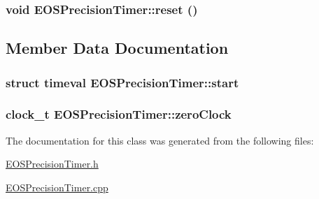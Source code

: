 \hypertarget{classEOSPrecisionTimer_252f1f26efaad6d549de98f9364389ad}{
\subsubsection[{reset}]{\setlength{\rightskip}{0pt plus 5cm}void EOSPrecisionTimer::reset ()}}
\label{classEOSPrecisionTimer_252f1f26efaad6d549de98f9364389ad}




\subsection{Member Data Documentation}
\hypertarget{classEOSPrecisionTimer_df3423fdc02dd0f4356493f2a5733b6e}{
\subsubsection[{start}]{\setlength{\rightskip}{0pt plus 5cm}struct timeval {\bf EOSPrecisionTimer::start}}}
\label{classEOSPrecisionTimer_df3423fdc02dd0f4356493f2a5733b6e}


\hypertarget{classEOSPrecisionTimer_74532635410d19d7294fe12c31b6549c}{
\subsubsection[{zeroClock}]{\setlength{\rightskip}{0pt plus 5cm}clock\_\-t {\bf EOSPrecisionTimer::zeroClock}}}
\label{classEOSPrecisionTimer_74532635410d19d7294fe12c31b6549c}




The documentation for this class was generated from the following files:\begin{CompactItemize}
\item 
\hyperlink{EOSPrecisionTimer_8h}{EOSPrecisionTimer.h}\item 
\hyperlink{EOSPrecisionTimer_8cpp}{EOSPrecisionTimer.cpp}\end{CompactItemize}
